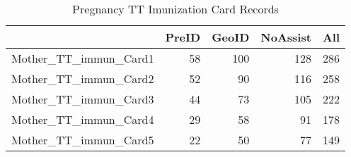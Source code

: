 \begin{table}[ht]
\centering
\begin{tabular}{rrrrr}
  \hline
 & PreID & GeoID & NoAssist & All \\ 
  \hline
Mother\_TT\_immun\_Card1 &  58 & 100 & 128 & 286 \\ 
  Mother\_TT\_immun\_Card2 &  52 &  90 & 116 & 258 \\ 
  Mother\_TT\_immun\_Card3 &  44 &  73 & 105 & 222 \\ 
  Mother\_TT\_immun\_Card4 &  29 &  58 &  91 & 178 \\ 
  Mother\_TT\_immun\_Card5 &  22 &  50 &  77 & 149 \\ 
   \hline
\end{tabular}
\caption{Pregnancy TT Imunization Card Records} 
\end{table}
